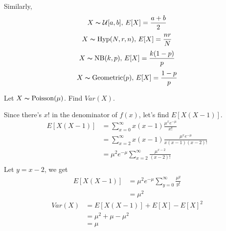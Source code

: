 Similarly,
\[ X \thicksim \operatorname{\mathcal{U}}[a,b],\, E[X]=\frac{a+b}{2} \]
\[ X \thicksim \operatorname{Hyp}(N,r,n),\, E[X]=\frac{nr}{N} \]
\[ X \thicksim \operatorname{NB}(k,p),\,E[X]=\frac{k(1-p)}{p} \]
\[ X \thicksim \operatorname{Geometric}(p),\,E[X]=\frac{1-p}{p} \]

Let $ X \thicksim \operatorname{Poisson}(\mu) $. Find $ Var(X) $.

Since there's $ x! $ in the denominator of $ f(x) $, let's find
$ E[X(X-1)] $.
\begin{align*}
    E[X(X-1)] & =\sum\limits_{x=0}^{\infty}x(x-1)\frac{\mu^x e^{-\mu}}{x!}           \\
              & =\sum\limits_{x=2}^{\infty}x(x-1)\frac{\mu^x e^{-\mu}}{x(x-1)(x-2)!} \\
              & =\mu^2e^{-\mu}\sum\limits_{x=2}^{\infty} \frac{\mu^{x-2}}{(x-2)!}    \\
\end{align*}
Let $ y=x-2 $, we get
\begin{align*}
    E[X(X-1)] & =\mu^2e^{-\mu}\sum\limits_{y=0}^{\infty} \frac{\mu^{y}}{y!} \\
              & =\mu^2
\end{align*}
\begin{align*}
    Var(X) & =E[X(X-1)]+E[X]-E[X]^2 \\
           & =\mu^2+\mu-\mu^2       \\
           & =\mu
\end{align*}

